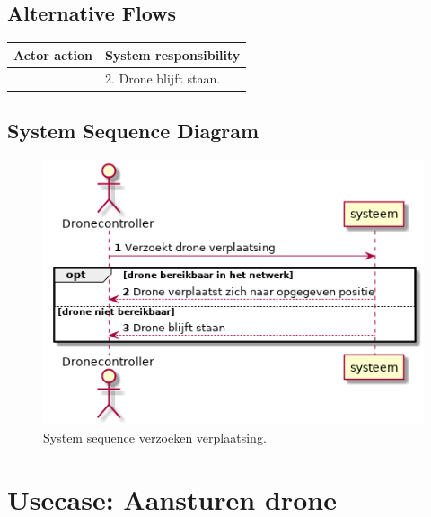 \documentclass[a4paper, 11pt, oneside]{report}
\begin{document}
\subsection{Alternative Flows}


\begin{table}[H]
	\centering
	\begin{tabular}{|l|l|}
		\hline
		\rowcolor[HTML]{C0C0C0} 
		Actor action  & System responsibility   \\ \hline
	    & 2. Drone blijft staan. \\ \hline
	\end{tabular}
\end{table}


\subsection{System Sequence Diagram }
\label{Usecase:verzoekverplaatsing:systemsequence}

\begin{figure}[H]
	\begin{center}\includegraphics[height=.3\textheight]{UML/out/usecase/sequence/verzoekendroneverplaatsing/verzoekendroneverplaatsing.png}\end{center}
	\caption{System sequence verzoeken verplaatsing.}
	\label{fig:verzoekverplaatsing:systemsequence}
\end{figure}


\section[Aansturen drone]{Usecase: Aansturen drone}
\label{Usecase:aansturendrone}
\end{document}
